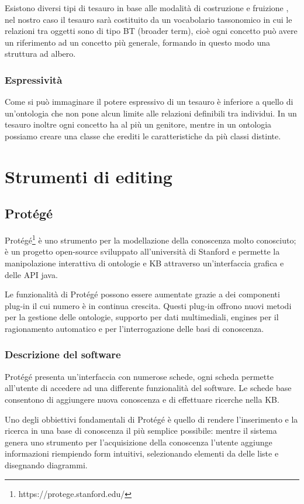 Esistono diversi tipi di tesauro in base alle modalità di costruzione e fruizione \cite{kilgarriff2000s}, nel nostro caso il tesauro sarà costituito da un vocabolario tassonomico in cui le relazioni tra oggetti sono di tipo BT (broader term), cioè ogni concetto può avere un riferimento ad un concetto più generale, formando in questo modo una struttura ad albero. 
\subsubsection{Espressività}
Come si può immaginare il potere espressivo di un tesauro è inferiore a quello di un'ontologia che non pone alcun limite alle relazioni definibili tra individui. In un tesauro inoltre ogni concetto ha al più un genitore, mentre in un ontologia possiamo creare una classe che erediti le caratteristiche da più classi distinte.
\section{Strumenti di editing}

\subsection{Protégé}
Protégé\footnote{https://protege.stanford.edu/} è uno strumento per la modellazione della conoscenza molto conosciuto; è un progetto open-source sviluppato all'università di Stanford e permette la manipolazione interattiva di ontologie e KB attraverso un'interfaccia grafica e delle API java.

Le funzionalità di Protégé possono essere aumentate grazie a dei componenti plug-in il cui numero è in continua crescita. Questi plug-in offrono nuovi metodi per la gestione delle ontologie, supporto per dati multimediali, engines per il ragionamento automatico e per l'interrogazione delle basi di conoscenza\cite{sivakumar2011ontology}.
\subsubsection{Descrizione del software}
Protégé presenta un'interfaccia con numerose schede, ogni scheda permette all'utente di accedere ad una differente funzionalità del software. Le schede base consentono di aggiungere nuova conoscenza e di effettuare ricerche nella KB.

Uno degli obbiettivi fondamentali di Protégé è quello di rendere l'inserimento e la ricerca in una base di conoscenza il più semplice possibile: mentre il sistema genera uno strumento per l'acquisizione della conoscenza l'utente aggiunge informazioni riempiendo form intuitivi, selezionando elementi da delle liste e disegnando diagrammi.

